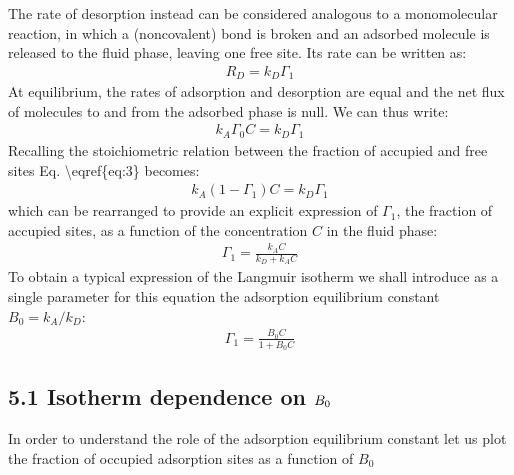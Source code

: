 \documentclass[letterpaper,10pt,english]{jupyterBook}
\begin{document}
\sphinxAtStartPar
The rate of desorption instead can be considered analogous to a monomolecular reaction, in which a (non\sphinxhyphen{}covalent) bond is broken and an adsorbed molecule is released to the fluid phase, leaving one free site. Its rate can be written as:
\begin{equation}\label{equation:Langmuir_isotherm:LANGeq2}
\begin{split}
R_D=k_D\Gamma_1
\end{split}
\end{equation}
\sphinxAtStartPar
At equilibrium, the rates of adsorption and desorption are equal and the net flux of molecules to and from the adsorbed phase is null.
We can thus write:
\begin{equation}\label{equation:Langmuir_isotherm:LANGeq3}
\begin{split}
k_A\Gamma_0{C}=k_D\Gamma_1
\end{split}
\end{equation}
\sphinxAtStartPar
Recalling the stoichiometric relation between the fraction of accupied and free sites Eq. \textbackslash{}eqref\{eq:3\} becomes:
\begin{equation}\label{equation:Langmuir_isotherm:LANGeq4}
\begin{split}
k_A(1-\Gamma_1){C}=k_D\Gamma_1
\end{split}
\end{equation}
\sphinxAtStartPar
which can be rearranged to provide an explicit expression of \(\Gamma_1\), the fraction of accupied sites, as a function of the concentration \(C\) in the fluid phase:
\begin{equation}\label{equation:Langmuir_isotherm:LANGeq5}
\begin{split}
\Gamma_1=\frac{k_A{C}}{k_D+k_A{C}}
\end{split}
\end{equation}
\sphinxAtStartPar
To obtain a typical expression of the Langmuir isotherm we shall introduce as a single parameter for this equation the adsorption equilibrium constant \(B_0=k_A/k_D\):
\begin{equation}\label{equation:Langmuir_isotherm:LANGeq6}
\begin{split}
\Gamma_1=\frac{B_0{C}}{1+B_0{C}}
\end{split}
\end{equation}

\subsection{5.1 Isotherm dependence on \protect\(B_0\protect\)}
\label{\detokenize{Langmuir_isotherm:isotherm-dependence-on-b-0}}
\sphinxAtStartPar
In order to understand the role of the adsorption equilibrium constant let us plot the fraction of occupied adsorption sites as a function of \(B_0\)
\end{document}
